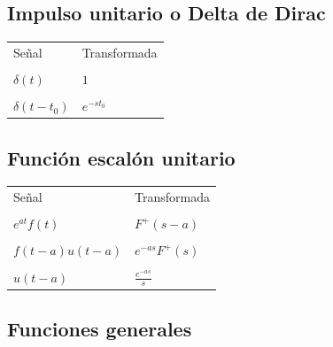 \subsection{Impulso unitario o Delta de Dirac}

\begin{center}
\begin{tabular}{ll}
Se\~{n}al                               &       Transformada                            \\
& \\
$\delta \left( t\right) $ & $1$ \\ 
& \\
$\delta \left( t-t_{0}\right) $ & $e^{-st_{0}}$
\end{tabular}

\end{center}

\subsection{Funci\'{o}n escal\'{o}n unitario}

\begin{center}
\begin{tabular}{ll}
Se\~{n}al                               &       Transformada                            \\
& \\
$e^{at}f\left( t\right) $ & $F^{+}\left( s-a\right) $ \\ 
& \\
$f\left( t-a\right) u\left( t-a\right)  $ & $e^{-as}F^{+}\left( s\right) $ \\ 
& \\
$u\left( t-a\right) $ & $\frac{e^{-as}}{s}$
\end{tabular}

\end{center}

\subsection{Funciones generales}

